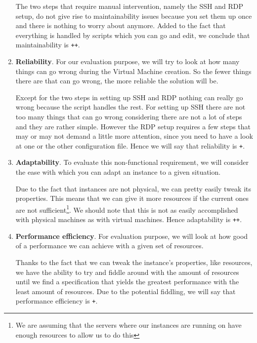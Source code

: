 \begin{enumerate}
	The two steps that require manual intervention, namely the SSH
	and RDP setup, do not give rise to maintainability issues because
	you set them up once and there is nothing to worry about anymore.
	Added to the fact that everything is handled by scripts which you
	can go and edit, we conclude that maintainability is \verb|++|.

	\item \textbf{Reliability}.  For our evaluation
	purpose, we will try to look at how many things can go wrong
	during the Virtual Machine creation. So the fewer things there are
	that can go wrong, the more reliable the solution will be.

	Except for the two steps in setting up SSH and RDP nothing can
	really go wrong because the script handles the rest. For setting
	up SSH there are not too many things that can go wrong considering
	there are not a lot of steps and they are rather simple. However
	the RDP setup requires a few steps that may or may not demand a
	little more attention, since you need to have a look at one or the
	other configuration file. Hence we will say that reliability is
	\verb|+|.

	\item \textbf{Adaptability}. To evaluate this non-functional
	requirement, we will consider the ease with which you can adapt an
	instance to a given situation.
	
	Due to the fact that instances are not physical, we can pretty
	easily tweak its properties. This means that we can give it more
	resources if the current ones are not sufficient\footnote{We are
	assuming that the servers where our instances are running on have
	enough resources to allow us to do this}. We should note that this
	is not as easily accomplished with physical machines as with
	virtual machines. Hence adaptability is \verb|++|.

	\item \textbf{Performance efficiency}. For evaluation purpose, we
	will look at how good of a performance we can achieve with a given
	set of resources.

	Thanks to the fact that we can tweak the instance's properties, like
	resources, we have the ability to try and fiddle around with the
	amount of resources until we find a specification that yields the
	greatest performance with the least amount of resources. Due to
	the potential fiddling, we will say that performance efficiency is
	\verb|+|.

\end{enumerate}

